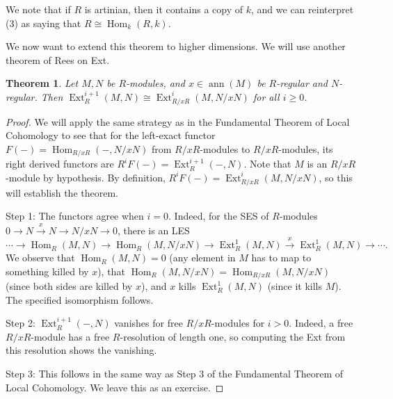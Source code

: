 \documentclass[11pt]{book}
\newtheorem{theorem}{Theorem}[chapter]
\numberwithin{equation}{section}
\numberwithin{theorem}{chapter}
\theoremstyle{definition}
\newtheorem*{basic properties}{Basic Properties}
\newtheorem*{Important Remark}{Important Remark}
\theoremstyle{remark}
\newcommand{\Hom}{\operatorname{Hom}}
\newcommand{\Ext}{\operatorname{Ext}}
\newcommand{\ann}{\operatorname{ann}}
\begin{document}
We note that if $R$ is artinian, then it contains a copy of $k$, and we can reinterpret (3) as saying that $R\cong \Hom_k(R,k)$.

We now want to extend this theorem to higher dimensions. We will use another theorem of Rees on Ext.

\begin{theorem}
	Let $M,N$ be $R$-modules, and $x\in \ann(M)$ be $R$-regular and $N$-regular. Then $\Ext^{i+1}_R(M,N)\cong \Ext^{i}_{R/xR}(M,N/xN)$ for all $i\geq 0$.
\end{theorem}
\begin{proof}
	We will apply the same strategy as in the Fundamental Theorem of Local Cohomology to see that for the left-exact functor $F(-)=\Hom_{R/xR}(-,N/xN)$ from $R/xR$-modules to $R/xR$-modules, its right derived functors are $R^i F(-)=\Ext^{i+1}_R(-,N)$. Note that $M$ is an $R/xR$-module by hypothesis. By definition, $R^i F(-)=\Ext^{i}_{R/xR}(M,N/xN)$, so this will establish the theorem.
	
	Step 1: The functors agree when $i=0$. Indeed, for the SES of $R$-modules $0\to N \stackrel{x}{\longrightarrow} N \to N/xN \to 0$, there is an LES
	\[ \cdots \to \Hom_R(M,N) \to \Hom_R(M,N/xN) \to \Ext^1_{R}(M,N) \stackrel{x}{\longrightarrow} \Ext^1_{R}(M,N) \to \cdots.   \]
	We observe that $\Hom_R(M,N)=0$ (any element in $M$ has to map to something killed by $x$), that $\Hom_R(M,N/xN)=\Hom_{R/xR}(M,N/xN)$ (since both sides are killed by $x$), and $x$ kills $\Ext^1_{R}(M,N)$ (since it kills $M$). The specified isomorphism follows.
	
	Step 2: $\Ext^{i+1}_R(-,N)$ vanishes for free $R/xR$-modules for  $i>0$. Indeed, a free $R/xR$-module has a free $R$-resolution of length one, so computing the Ext from this resolution shows the vanishing.
	
	Step 3: This follows in the same way as Step 3 of the Fundamental Theorem of Local Cohomology. We leave this as an exercise.
\end{proof}
\end{document}
